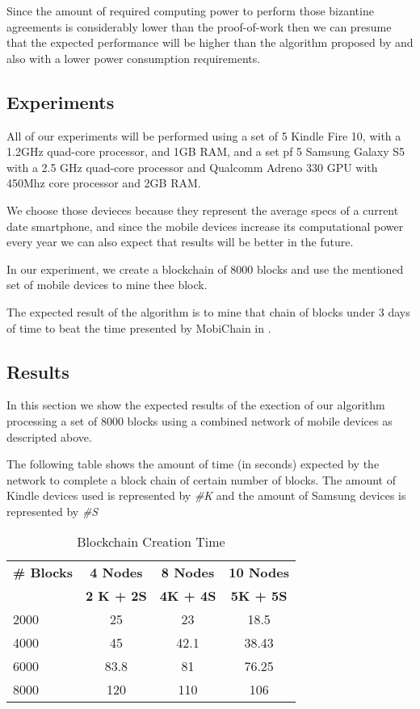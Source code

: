 \documentclass[journal]{IEEEtran}
\begin{document}
Since the amount of required computing power to perform those bizantine agreements is considerably lower than the proof-of-work then we can presume that the expected performance will be higher than the algorithm proposed by \cite{Suankaewmanee} and also with a lower power consumption requirements.


\subsection{Experiments}
All of our experiments will be performed using a set of  5 Kindle Fire 10, with a 1.2GHz quad-core processor, and 1GB RAM, and a set pf 5 Samsung Galaxy S5 with a 2.5 GHz quad-core processor and Qualcomm Adreno 330 GPU with 450Mhz core processor and 2GB RAM.

We choose those devieces because they represent the average specs of a current date smartphone, and since the mobile devices increase its computational power every year we can also expect that results will be better in the future.

In our experiment, we create a blockchain of 8000 blocks and use the mentioned set of mobile devices to mine thee block.

The expected result of the algorithm is to mine that chain of blocks under 3 days of time to beat the time presented by MobiChain in \cite{Suankaewmanee}. 

\subsection{Results}

In this section we show the expected results of the exection of our algorithm processing a set of 8000 blocks using a combined network of mobile devices as descripted above.

The following table shows the amount of time (in seconds) expected by the network to complete a block chain of certain number of blocks. The amount of Kindle devices used is represented by \emph{\#K} and the amount of Samsung devices is represented by \emph{\#S} 

\begin{table}[h!] 
\begin{center} 
\begin{tabular}{|l|c|c|c|}
\hline 

\textbf{\# Blocks} & \textbf{4 Nodes} & \textbf{8 Nodes}  & \textbf{10 Nodes}  \\ 
\textbf{}& \textbf{2 K + 2S} & \textbf{4K + 4S} & \textbf{5K + 5S} \\
\hline 
2000 & 25 & 23 & 18.5\\ 
\hline 
4000 & 45 & 42.1 & 38.43\\ 
\hline 
6000 & 83.8 & 81 & 76.25 \\ 
\hline 
8000 & 120 & 110 & 106 \\
\hline 

\end{tabular} 
\end{center} 
\caption{Blockchain Creation Time} 
\end{table}
\end{document}

